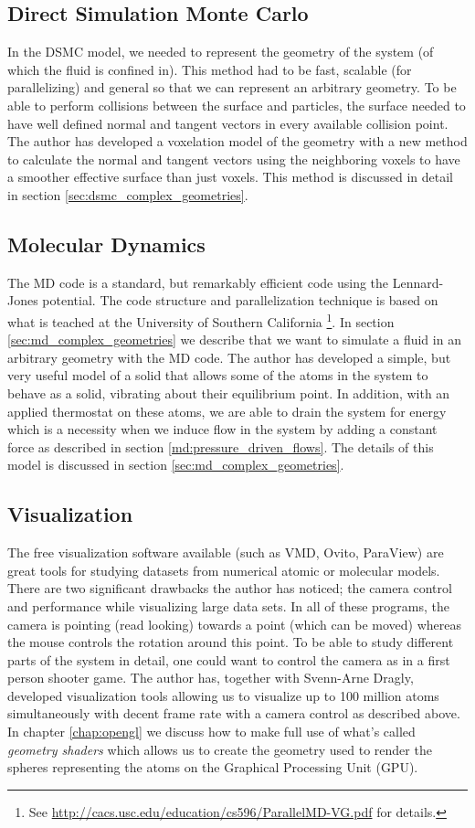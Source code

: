 \subsection{Direct Simulation Monte Carlo}
In the DSMC model, we needed to represent the geometry of the system (of which the fluid is confined in). This method had to be fast, scalable (for parallelizing) and general so that we can represent an arbitrary geometry. To be able to perform collisions between the surface and particles, the surface needed to have well defined normal and tangent vectors in every available collision point. The author has developed a voxelation model of the geometry with a new method to calculate the normal and tangent vectors using the neighboring voxels to have a smoother effective surface than just voxels. This method is discussed in detail in section \ref{sec:dsmc_complex_geometries}.
\subsection{Molecular Dynamics}
The MD code is a standard, but remarkably efficient code using the Lennard-Jones potential. The code structure and parallelization technique is based on what is teached at the University of Southern California \footnote{See \url{http://cacs.usc.edu/education/cs596/ParallelMD-VG.pdf} for details.}. In section \ref{sec:md_complex_geometries} we describe that we want to simulate a fluid in an arbitrary geometry with the MD code. The author has developed a simple, but very useful model of a solid that allows some of the atoms in the system to behave as a solid, vibrating about their equilibrium point. In addition, with an applied thermostat on these atoms, we are able to drain the system for energy which is a necessity when we induce flow in the system by adding a constant force as described in section \ref{md:pressure_driven_flows}. The details of this model is discussed in section \ref{sec:md_complex_geometries}.
\subsection{Visualization}
The free visualization software available (such as VMD, Ovito, ParaView) are great tools for studying datasets from numerical atomic or molecular models. There are two significant drawbacks the author has noticed; the camera control and performance while visualizing large data sets. In all of these programs, the camera is pointing (read looking) towards a point (which can be moved) whereas the mouse controls the rotation around this point. To be able to study different parts of the system in detail, one could want to control the camera as in a first person shooter game. The author has, together with Svenn-Arne Dragly, developed visualization tools allowing us to visualize up to 100 million atoms simultaneously with decent frame rate with a camera control as described above. In chapter \ref{chap:opengl} we discuss how to make full use of what's called \textit{geometry shaders} which allows us to create the geometry used to render the spheres representing the atoms on the Graphical Processing Unit (GPU).